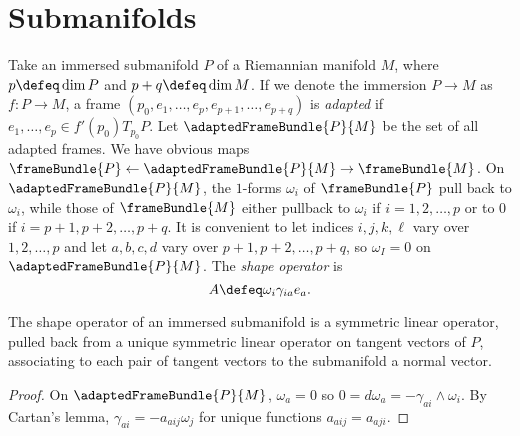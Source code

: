 \section{Submanifolds}
Take an immersed submanifold \(P\) of a Riemannian manifold \(M\), where \(p\defeq \dim P\) and \(p+q \defeq \dim M\).
If we denote the immersion \(P \to M\) as \(f \colon P \to M\), a frame \((p_0,e_1,\dots,e_p,e_{p+1},\dots,e_{p+q})\) is \emph{adapted} if \(e_1, \dots, e_p \in f'(p_0) T_{p_0} P\).
Let \(\adaptedFrameBundle{P}{M}\) be the set of all adapted frames.
We have obvious maps \(\frameBundle{P} \gets \adaptedFrameBundle{P}{M} \to \frameBundle{M}\).
On \(\adaptedFrameBundle{P}{M}\), the \(1\)-forms \(\omega_i\) of \(\frameBundle{P}\) pull back to \(\omega_i\), while those of \(\frameBundle{M}\) either pullback to \(\omega_i\) if \(i=1,2,\dots,p\) or to \(0\) if \(i=p+1,p+2,\dots,p+q\).
It is convenient to let indices \(i,j,k,\ell\) vary over \(1,2,\dots,p\) and let \(a,b,c,d\) vary over \(p+1,p+2,\dots,p+q\), so \(\omega_I=0\) on \(\adaptedFrameBundle{P}{M}\).
The \emph{shape operator} is
\[
A \defeq \omega_i \gamma_{ia} e_a.
\]
\begin{lemma}
The shape operator of an immersed submanifold is a symmetric linear operator, pulled back from a unique symmetric linear operator on tangent vectors of \(P\), associating to each pair of tangent vectors to the submanifold a normal vector.
\end{lemma}
\begin{proof}
On \(\adaptedFrameBundle{P}{M}\), \(\omega_a=0\) so \(0=d\omega_a=-\gamma_{ai} \wedge \omega_i\).
By Cartan's lemma, \(\gamma_{ai}=-a_{aij} \omega_j\) for unique functions \(a_{aij}=a_{aji}\).
\end{proof}



